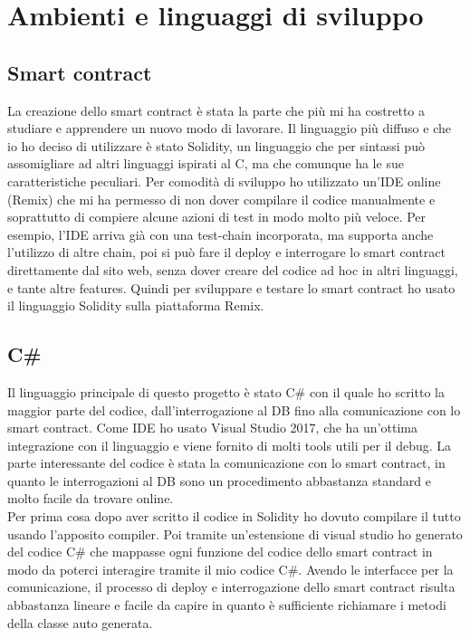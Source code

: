 \section{Ambienti e linguaggi di sviluppo}
    \subsection{Smart contract}
    La creazione dello smart contract è stata la parte che più mi ha costretto a studiare e apprendere un nuovo modo di lavorare.
    Il linguaggio più diffuso e che io ho deciso di utilizzare è stato Solidity, un linguaggio che per sintassi può assomigliare ad altri linguaggi ispirati al C, ma che comunque ha le sue caratteristiche peculiari. 
    Per comodità di sviluppo ho utilizzato un'IDE online (Remix) che mi ha permesso di non dover compilare il codice manualmente e soprattutto di compiere alcune azioni di test in modo molto più veloce. Per esempio, l'IDE arriva già con una test-chain incorporata, ma supporta anche l'utilizzo di altre chain, poi si può fare il deploy e interrogare lo smart contract direttamente dal sito web, senza dover creare del codice ad hoc in altri linguaggi, e tante altre features.
    Quindi per sviluppare e testare lo smart contract ho usato il linguaggio Solidity sulla piattaforma Remix.
    
    \subsection{C\#}
    Il linguaggio principale di questo progetto è stato C\# con il quale ho scritto la maggior parte del codice, dall'interrogazione al DB fino alla comunicazione con lo smart contract.
    Come IDE ho usato Visual Studio 2017, che ha un'ottima integrazione con il linguaggio e viene fornito di molti tools utili per il debug.
    La parte interessante del codice è stata la comunicazione con lo smart contract, in quanto le interrogazioni al DB sono un procedimento abbastanza standard e molto facile da trovare online.\\
    Per prima cosa dopo aver scritto il codice in Solidity ho dovuto compilare il tutto usando l'apposito compiler. Poi tramite un'estensione di visual studio ho generato del codice C\# che mappasse ogni funzione del codice dello smart contract in modo da poterci interagire tramite il mio codice C\#. Avendo le interfacce per la comunicazione, il processo di deploy e interrogazione dello smart contract risulta abbastanza lineare e facile da capire in quanto è sufficiente richiamare i metodi della classe auto generata.
    
